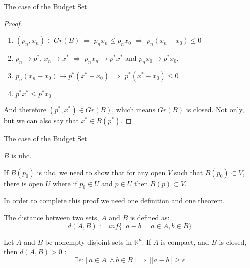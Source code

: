 \documentclass[aspectratio=169, handout]{beamer}
\begin{document}
\begin{frame}{The case of the Budget Set}
    \begin{proof}
    \begin{enumerate}
        \item $(p_n,x_n)\in Gr(B)\ \Rightarrow\ p_n x_n \leq p_n x_0$ $\Rightarrow$ $p_n(x_n-x_0)\leq 0$
        \item $p_n\rightarrow p^*$, $x_n\rightarrow x^*$ $\Rightarrow$ $p_nx_n\rightarrow p^*x^*$ and $p_nx_0\rightarrow p^*x_0$.
        \item $p_n(x_n-x_0)\rightarrow p^*(x^*-x_0)$ $\Rightarrow$ $p^*(x^*-x_0)\leq 0$
        \item $p^*x^*\leq p^*x_0$
    \end{enumerate}
    
    And therefore $(p^*,x^*)\in Gr(B)$, which means $Gr(B)$ is closed. Not only, but we can also say that $x^*\in B(p^*)$.
    \end{proof}
\end{frame}

\begin{frame}{The case of the Budget Set}
    \begin{theorem}
        $B$ is uhc.
    \end{theorem}

    If $B(p_0)$ is uhc, we need to show that for any open $V$ such that $B(p_0)\subset V$, there is open $U$ where if $p_0\in U$ and $p\in U$ then $B(p)\subset V$.

\end{frame}

\begin{frame}
    In order to complete this proof we need one definition and one theorem.

    \begin{definition}
        The distance between two sets, $A$ and $B$ is defined as: \[d(A,B):=inf\{||a-b|| \mid a\in A, b\in B\}\]
    \end{definition}

    \begin{theorem}
        Let $A$ and $B$ be nonempty disjoint sets in $\mathds{R}^n$. If $A$ is compact, and $B$ is closed, then $d(A,B)>0$ : \[\exists \epsilon : [a\in A\ \wedge b\in B]\Rightarrow\ ||a-b||\geq \epsilon\]
    \end{theorem}
\end{frame}
\end{document}
